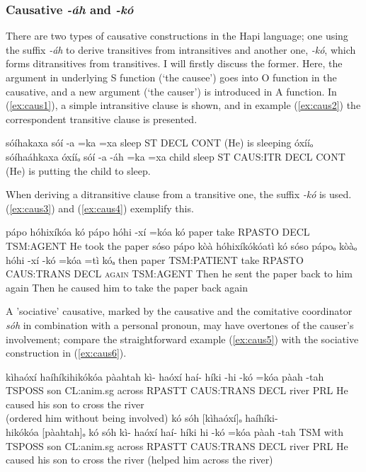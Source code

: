 \documentclass[a4paper, 12pt, oneside]{memoir}
\newcommand{\emh}[1]{\textit{#1}}
\begin{document}
\subsubsection{Causative \emh{-áh} and \emh{-kó}}\label{s:caus}
There are two types of causative constructions in the Hapi language; one using the suffix \emh{-áh} to derive transitives from intransitives and another one, \emh{-kó}, which forms ditransitives from transitives. I will firstly discuss the former. Here, the argument in underlying S function (`the causee') goes into O function in the causative, and a new argument (`the causer') is introduced in A function. In (\ref{ex:caus1}), a simple intransitive clause is shown, and in example (\ref{ex:caus2}) the correspondent transitive clause is presented.
\begin{examples}
    \ex \label{ex:caus1}
    \words sóíhakaxa
    \bits sóí -a =ka =xa
    \gloss sleep ST DECL CONT
    \tr (He) is sleeping
    \ex \label{ex:caus2}
    \words óxííₒ sóíhaáhkaxa
    \bits óxííₒ sóí -a -áh =ka =xa
    \gloss child sleep ST CAUS:ITR DECL CONT 
    \tr (He) is putting the child to sleep.
\end{examples}
When deriving a ditransitive clause from a transitive one, the suffix \emh{-kó} is used. (\ref{ex:caus3}) and (\ref{ex:caus4}) exemplify this.
\begin{examples}
    \ex \label{ex:caus3}
    \words pápo hóhixíkóa kó
    \bits pápo hóhi -xí =kóa kó
    \gloss paper take RPASTO DECL TSM:AGENT
    \tr He took the paper
    \ex \label{ex:caus4}
    \words sóso pápo kòà hóhixíkókóatì kó
    \bits sóso pápoₒ kòàₒ hóhi -xí -kó =kóa =tì kóₐ 
    \gloss then paper TSM:PATIENT take RPASTO CAUS:TRANS DECL \textsc{\textup{again}} TSM:AGENT
    \tr Then he sent the paper back to him again
    \tr Then he caused him to take the paper back again
\end{examples}
A 'sociative' causative, marked by the causative and the comitative coordinator \emh{sóh} in combination with a personal pronoun, may have overtones of the causer's involvement; compare the straightforward example (\ref{ex:caus5}) with the sociative construction in (\ref{ex:caus6}).
\begin{examples}
    \ex \label{ex:caus5}
    \words kìhaóxí haíhíkihikókóa pàahtah
    \bits kì- haóxí haí- híki -hi -kó =kóa pàah -tah
    \gloss TSPOSS son CL:anim.sg across RPASTT CAUS:TRANS DECL river PRL 
    \tr He caused his son to cross the river \\ (ordered him without being involved)
    \ex \label{ex:caus6}
    \words kó sóh [kìhaóxí]ₒ haíhíki- \\ hikókóa [pàahtah]ₒ
    \bits kó sóh kì- haóxí haí- híki hi -kó =kóa pàah -tah 
    \gloss TSM with TSPOSS son CL:anim.sg across RPASTT CAUS:TRANS DECL river PRL
    \tr He caused his son to cross the river (helped him across the river)
\end{examples}
\end{document}
